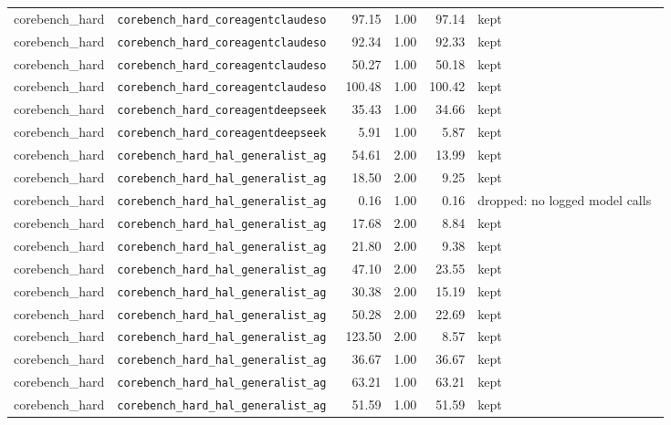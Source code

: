 {\begin{longtable}{llrrrl}
corebench\_hard & \texttt{\scriptsize corebench\_hard\_coreagentclaudeso~} & 97.15 & 1.00 & 97.14 & kept \\
corebench\_hard & \texttt{\scriptsize corebench\_hard\_coreagentclaudeso~} & 92.34 & 1.00 & 92.33 & kept \\
corebench\_hard & \texttt{\scriptsize corebench\_hard\_coreagentclaudeso~} & 50.27 & 1.00 & 50.18 & kept \\
corebench\_hard & \texttt{\scriptsize corebench\_hard\_coreagentclaudeso~} & 100.48 & 1.00 & 100.42 & kept \\
corebench\_hard & \texttt{\scriptsize corebench\_hard\_coreagentdeepseek~} & 35.43 & 1.00 & 34.66 & kept \\
corebench\_hard & \texttt{\scriptsize corebench\_hard\_coreagentdeepseek~} & 5.91 & 1.00 & 5.87 & kept \\
corebench\_hard & \texttt{\scriptsize corebench\_hard\_hal\_generalist\_ag~} & 54.61 & 2.00 & 13.99 & kept \\
corebench\_hard & \texttt{\scriptsize corebench\_hard\_hal\_generalist\_ag~} & 18.50 & 2.00 & 9.25 & kept \\
corebench\_hard & \texttt{\scriptsize corebench\_hard\_hal\_generalist\_ag~} & 0.16 & 1.00 & 0.16 & dropped: no logged model calls~ \\
corebench\_hard & \texttt{\scriptsize corebench\_hard\_hal\_generalist\_ag~} & 17.68 & 2.00 & 8.84 & kept \\
corebench\_hard & \texttt{\scriptsize corebench\_hard\_hal\_generalist\_ag~} & 21.80 & 2.00 & 9.38 & kept \\
corebench\_hard & \texttt{\scriptsize corebench\_hard\_hal\_generalist\_ag~} & 47.10 & 2.00 & 23.55 & kept \\
corebench\_hard & \texttt{\scriptsize corebench\_hard\_hal\_generalist\_ag~} & 30.38 & 2.00 & 15.19 & kept \\
corebench\_hard & \texttt{\scriptsize corebench\_hard\_hal\_generalist\_ag~} & 50.28 & 2.00 & 22.69 & kept \\
corebench\_hard & \texttt{\scriptsize corebench\_hard\_hal\_generalist\_ag~} & 123.50 & 2.00 & 8.57 & kept \\
corebench\_hard & \texttt{\scriptsize corebench\_hard\_hal\_generalist\_ag~} & 36.67 & 1.00 & 36.67 & kept \\
corebench\_hard & \texttt{\scriptsize corebench\_hard\_hal\_generalist\_ag~} & 63.21 & 1.00 & 63.21 & kept \\
corebench\_hard & \texttt{\scriptsize corebench\_hard\_hal\_generalist\_ag~} & 51.59 & 1.00 & 51.59 & kept \\

\end{longtable}}

